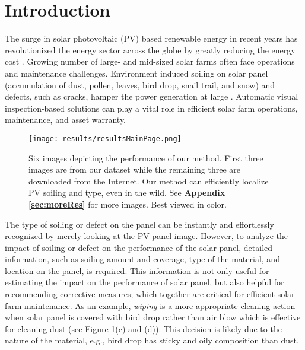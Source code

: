 \documentclass[10pt,twocolumn,letterpaper]{article}
\begin{document}
\vspace{-2mm}
\section{Introduction}
\vspace{-2mm}
The surge in solar photovoltaic (PV) based renewable energy in recent years has revolutionized the energy sector across the globe by greatly reducing the energy cost \cite{usa2020}. Growing number of large- and mid-sized solar farms often face operations and maintenance challenges. Environment induced soiling on solar panel (accumulation of dust, pollen, leaves, bird drop, snail trail, and snow) and defects,  such as cracks, hamper the power generation at large \cite{DustReview,MANI20103124,SoilingPwrLoss,Zapata2015}.  Automatic visual inspection-based solutions can play a vital role in efficient solar farm operations, maintenance, and asset warranty.

\begin{figure}[!t]
\centering
\setlength{\belowcaptionskip}{-4mm}
\texttt{[image: results/resultsMainPage.png]}
\caption{Six images depicting the performance of our method. First three images are from our dataset while the remaining three are downloaded from the Internet. Our method can efficiently localize PV soiling and type, even in the wild. See \textbf{Appendix \ref{sec:moreRes}} for more images. Best viewed in color.}
\label{fig:siximages}
\end{figure}

The type of soiling or defect on the panel can be instantly and effortlessly recognized by merely looking at the PV panel image. However, to analyze the impact of soiling or defect on the performance of the solar panel, detailed information, such as soiling amount and coverage, type of the material, and location on the panel, is required. This information is not only useful for estimating the impact on the performance of solar panel, but also helpful for recommending corrective measures; which together are critical for efficient solar farm maintenance. As an example, \textit{wiping} is a more appropriate cleaning action when solar panel is covered with bird drop rather than air blow which is effective for cleaning dust (see Figure \ref{fig:siximages}(c) and (d)). This decision is likely due to the nature of the material, e.g., bird drop has sticky and oily composition than dust.
\end{document}
